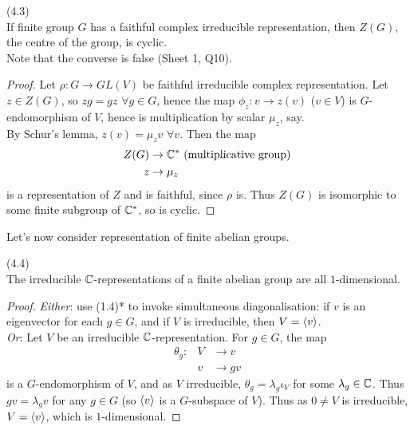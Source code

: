 \documentclass[a4paper]{article}
\begin{document}
\begin{coro} (4.3)\\
If finite group $G$ has a faithful complex irreducible representation, then $Z(G)$, the centre of the group, is cyclic.\\
Note that the converse is false (Sheet 1, Q10).
\begin{proof}
Let $\rho:G \to GL(V)$ be faithful irreducible complex representation. Let $z \in Z(G)$, so $zg = gz$ $\forall g \in G$, hence the map $\phi_z: v \to z(v)$ ($v \in V$) is $G$-endomorphism of $V$, hence is multiplication by scalar $\mu_z$, say.\\
By Schur's lemma, $z(v) = \mu_z v$ $\forall v$. Then the map 
\begin{equation*}
\begin{aligned}
Z(G) &\to \mathbb{C}^* \ (\text{multiplicative group})\\
z &\to \mu_z
\end{aligned}
\end{equation*}
is a representation of $Z$ and is faithful, since $\rho$ is. Thus $Z(G)$ is isomorphic to some finite subgroup of $\mathbb{C}^*$, so is cyclic.
\end{proof}
\end{coro}

Let's now consider representation of finite abelian groups.

\begin{coro} (4.4)\\
The irreducible $\mathbb{C}$-representations of a finite abelian group are all $1$-dimensional.
\begin{proof}
\emph{Either}: use (1.4)* to invoke simultaneous diagonalisation: if $v$ is an eigenvector for each $g \in G$, and if $V$ is irreducible, then $V=\langle v\rangle$.\\
\emph{Or}: Let $V$ be an irreducible $\mathbb{C}$-representation. For $g \in G$, the map
\begin{equation*}
\begin{aligned}
\theta_g: &V &\to v\\
&v &\to gv
\end{aligned}
\end{equation*}
is a $G$-endomorphism of $V$, and as $V$ irreducible, $\theta_g = \lambda_g \iota_V$ for some $\lambda_g \in \mathbb{C}$. Thus $gv = \lambda_g v$ for any $g \in G$ (so $\langle v\rangle$ is a $G$-subspace of $V$). Thus as $0 \neq V$ is irreducible, $V = \langle v\rangle$, which is $1$-dimensional.
\end{proof}
\end{coro}
\end{document}
